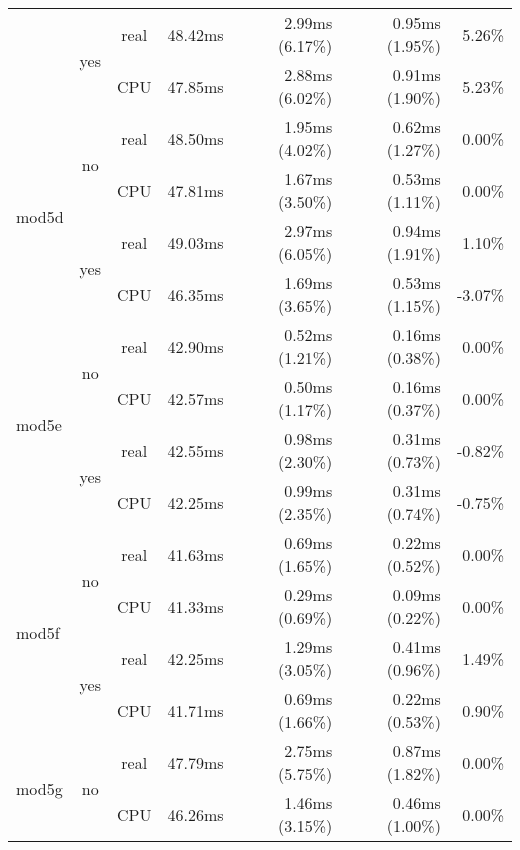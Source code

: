 \documentclass[en]{pracamgr}
\begin{document}
\begin{small}
\begin{longtable}{|l|c|c|r|r|r|r|}
                          \cline{2-7}
                          & \multirow{2}{*}{yes} & real & 48.42ms & 2.99ms (6.17\%) & 0.95ms (1.95\%) & 5.26\% \\*
                          &                      & CPU  & 47.85ms & 2.88ms (6.02\%) & 0.91ms (1.90\%) & 5.23\% \\
\hline
\multirow{4}{*}{mod5d}    & \multirow{2}{*}{no}  & real & 48.50ms & 1.95ms (4.02\%) & 0.62ms (1.27\%) & 0.00\% \\*
                          &                      & CPU  & 47.81ms & 1.67ms (3.50\%) & 0.53ms (1.11\%) & 0.00\% \\*
                          \cline{2-7}
                          & \multirow{2}{*}{yes} & real & 49.03ms & 2.97ms (6.05\%) & 0.94ms (1.91\%) & 1.10\% \\*
                          &                      & CPU  & 46.35ms & 1.69ms (3.65\%) & 0.53ms (1.15\%) & -3.07\% \\
\hline
\multirow{4}{*}{mod5e}    & \multirow{2}{*}{no}  & real & 42.90ms & 0.52ms (1.21\%) & 0.16ms (0.38\%) & 0.00\% \\*
                          &                      & CPU  & 42.57ms & 0.50ms (1.17\%) & 0.16ms (0.37\%) & 0.00\% \\*
                          \cline{2-7}
                          & \multirow{2}{*}{yes} & real & 42.55ms & 0.98ms (2.30\%) & 0.31ms (0.73\%) & -0.82\% \\*
                          &                      & CPU  & 42.25ms & 0.99ms (2.35\%) & 0.31ms (0.74\%) & -0.75\% \\
\hline
\multirow{4}{*}{mod5f}    & \multirow{2}{*}{no}  & real & 41.63ms & 0.69ms (1.65\%) & 0.22ms (0.52\%) & 0.00\% \\*
                          &                      & CPU  & 41.33ms & 0.29ms (0.69\%) & 0.09ms (0.22\%) & 0.00\% \\*
                          \cline{2-7}
                          & \multirow{2}{*}{yes} & real & 42.25ms & 1.29ms (3.05\%) & 0.41ms (0.96\%) & 1.49\% \\*
                          &                      & CPU  & 41.71ms & 0.69ms (1.66\%) & 0.22ms (0.53\%) & 0.90\% \\
\hline
\multirow{4}{*}{mod5g}    & \multirow{2}{*}{no}  & real & 47.79ms & 2.75ms (5.75\%) & 0.87ms (1.82\%) & 0.00\% \\*
                          &                      & CPU  & 46.26ms & 1.46ms (3.15\%) & 0.46ms (1.00\%) & 0.00\% \\*

\end{longtable}
\end{small}
\end{document}
